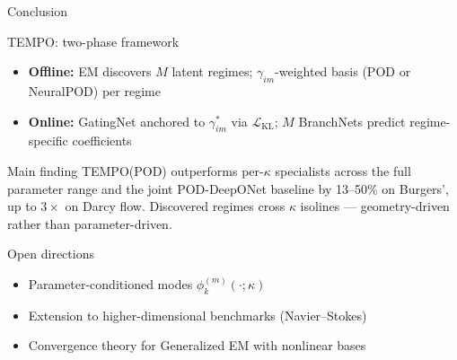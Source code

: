\documentclass[aspectratio=169]{beamer}
\begin{document}
\begin{frame}{Conclusion}

\begin{block}{TEMPO: two-phase framework}
  \begin{itemize}
    \item[{}] \textbf{Offline:} EM discovers $M$ latent regimes;
      $\gamma_{im}$-weighted basis (POD or NeuralPOD) per regime
    \item[{}] \textbf{Online:} GatingNet anchored to $\gamma_{im}^*$
      via $\mathcal{L}_\text{KL}$; $M$ BranchNets predict regime-specific coefficients
  \end{itemize}
\end{block}

\begin{block}{Main finding}
  TEMPO(POD) outperforms per-$\kappa$ specialists across the full parameter range
  and the joint POD-DeepONet baseline by 13--50\% on Burgers',
  up to $3{\times}$ on Darcy flow.
  Discovered regimes cross $\kappa$ isolines — geometry-driven rather than parameter-driven.
\end{block}

\begin{block}{Open directions}
  \begin{itemize}
    \item[{}] Parameter-conditioned modes $\phi_k^{(m)}(\cdot;\kappa)$
    \item[{}] Extension to higher-dimensional benchmarks (Navier--Stokes)
    \item[{}] Convergence theory for Generalized EM with nonlinear bases
  \end{itemize}
\end{block}

\end{frame}
\end{document}
